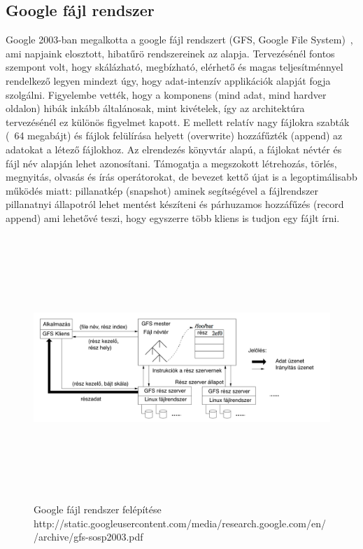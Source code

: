 \documentclass[a4paper,12pt]{article}
\begin{document}
\subsection{Google fájl rendszer}
Google 2003-ban megalkotta a google fájl rendszert (GFS, Google File System)~\cite{gfs}, ami napjaink elosztott, hibatűrö rendszereinek az alapja. Tervezésénél fontos szempont volt, hogy skálázható, megbízható, elérhető és magas teljesítménnyel rendelkező legyen mindezt úgy, hogy adat-intenzív applikációk alapját fogja szolgálni. Figyelembe vették, hogy a komponens (mind adat, mind hardver oldalon) hibák inkább általánosak, mint kivételek, így az architektúra tervezésénél ez különös figyelmet kapott. E mellett relatív nagy fájlokra szabták (~64 megabájt) és fájlok felülírása helyett (overwrite) 
hozzáfűzték (append) az adatokat a létező fájlokhoz. Az elrendezés könyvtár alapú, a fájlokat névtér és fájl név alapján lehet azonosítani. Támogatja a megszokott létrehozás, törlés, megnyitás, olvasás és írás operátorokat, de bevezet kettő újat is a legoptimálisabb működés miatt: pillanatkép (snapshot) aminek segítségével a fájlrendszer pillanatnyi állapotról lehet mentést készíteni és párhuzamos hozzáfűzés (record append) ami lehetővé teszi, hogy egyszerre több kliens is tudjon egy fájlt írni. 

\begin{figure}[ht!]
\centering
\includegraphics[width=130mm, height=100mm, keepaspectratio]{img/gfs.png}
\caption{Google fájl rendszer felépítése
http://static.googleusercontent.com/media/research.google.com/en//archive/gfs-sosp2003.pdf \label{gfs}}
\end{figure}
\end{document}

